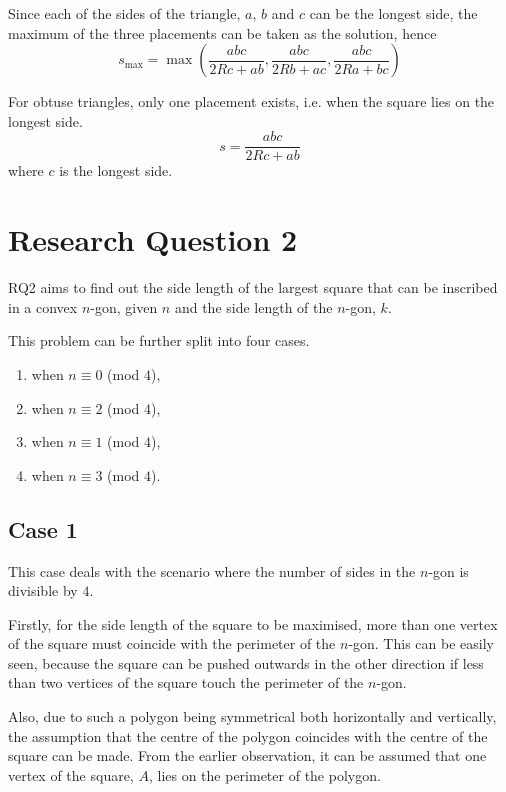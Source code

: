 \documentclass[12pt]{scrartcl}
\begin{document}
Since each of the sides of the triangle, $a$, $b$ and $c$ can be the longest side,
the maximum of the three placements can be taken as the solution, hence
\begin{equation}
	s_{\text{max}} = \max\left(\dfrac{abc}{2Rc+ab},\dfrac{abc}{2Rb+ac},\dfrac{abc}{2Ra+bc}\right)
\end{equation}

For obtuse triangles, only one placement exists, i.e. when the square lies on the longest side.
\begin{equation}
	s = \dfrac{abc}{2Rc+ab}
\end{equation}
where $c$ is the longest side.

\section{Research Question 2}

RQ2 aims to find out the side length of the largest square that can be inscribed in a convex $n$-gon,
given $n$ and the side length of the $n$-gon, $k$.

This problem can be further split into four cases.
\begin{enumerate}
	\item when \(n \equiv 0\) (mod $4$),
	\item when \(n \equiv 2\) (mod $4$),
	\item when \(n \equiv 1\) (mod $4$),
	\item when \(n \equiv 3\) (mod $4$). 
\end{enumerate}

\subsection{Case 1}
This case deals with the scenario where the number of sides in the $n$-gon is divisible by $4$.

Firstly, for the side length of the square to be maximised, more than one vertex of the square must coincide with the perimeter of the $n$-gon.
This can be easily seen, because the square can be pushed outwards in the other direction if less than two vertices of the square touch the perimeter of the $n$-gon.

Also, due to such a polygon being symmetrical both horizontally and vertically, the assumption that the centre of the polygon coincides with the centre of the square can be made. From the earlier observation, it can be assumed that one vertex of the square, $A$, lies on the perimeter of the polygon.

\printbibliography
\end{document}
